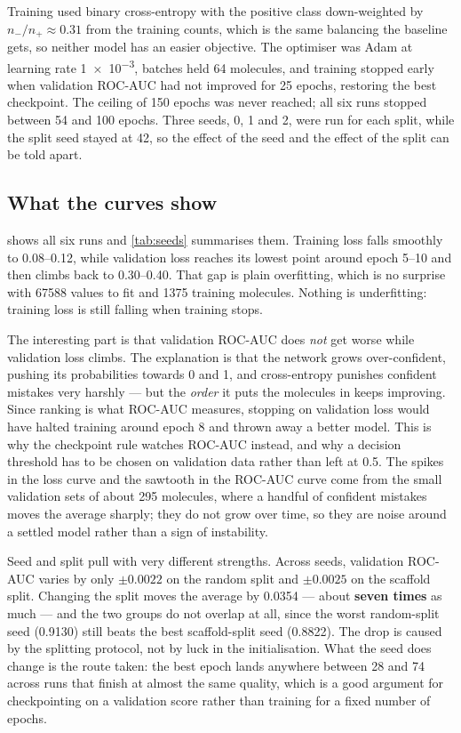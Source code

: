 Training used binary cross-entropy with the positive class down-weighted by $n_-/n_+ \approx 0.31$ from the training counts, which is the same balancing the baseline gets, so neither model has an easier objective. The optimiser was Adam \parencite{Adam} at learning rate \num{1e-3}, batches held 64 molecules, and training stopped early when validation ROC-AUC had not improved for 25 epochs, restoring the best checkpoint. The ceiling of 150 epochs was never reached; all six runs stopped between 54 and 100 epochs. Three seeds, 0, 1 and 2, were run for each split, while the split seed stayed at 42, so the effect of the seed and the effect of the split can be told apart.

\subsection{What the curves show}

 shows all six runs and \cref{tab:seeds} summarises them. Training loss falls smoothly to 0.08--0.12, while validation loss reaches its lowest point around epoch 5--10 and then climbs back to 0.30--0.40. That gap is plain overfitting, which is no surprise with \num{67588} values to fit and 1375 training molecules. Nothing is underfitting: training loss is still falling when training stops.

The interesting part is that validation ROC-AUC does \emph{not} get worse while validation loss climbs. The explanation is that the network grows over-confident, pushing its probabilities towards 0 and 1, and cross-entropy punishes confident mistakes very harshly --- but the \emph{order} it puts the molecules in keeps improving. Since ranking is what ROC-AUC measures, stopping on validation loss would have halted training around epoch 8 and thrown away a better model. This is why the checkpoint rule watches ROC-AUC instead, and why a decision threshold has to be chosen on validation data rather than left at 0.5. The spikes in the loss curve and the sawtooth in the ROC-AUC curve come from the small validation sets of about 295 molecules, where a handful of confident mistakes moves the average sharply; they do not grow over time, so they are noise around a settled model rather than a sign of instability.

Seed and split pull with very different strengths. Across seeds, validation ROC-AUC varies by only $\pm 0.0022$ on the random split and $\pm 0.0025$ on the scaffold split. Changing the split moves the average by 0.0354 --- about \textbf{seven times} as much --- and the two groups do not overlap at all, since the worst random-split seed (0.9130) still beats the best scaffold-split seed (0.8822). The drop is caused by the splitting protocol, not by luck in the initialisation. What the seed does change is the route taken: the best epoch lands anywhere between 28 and 74 across runs that finish at almost the same quality, which is a good argument for checkpointing on a validation score rather than training for a fixed number of epochs.

